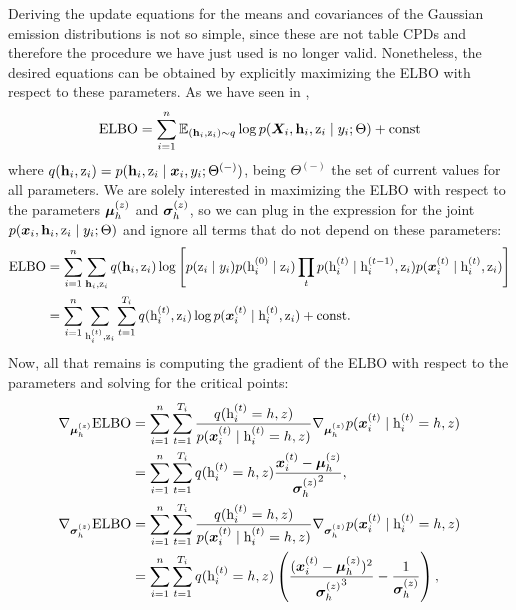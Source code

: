 Deriving the update equations for the means and covariances of the Gaussian emission distributions is not so simple, since these are not table CPDs and therefore the procedure we have just used is no longer valid. Nonetheless, the desired equations can be obtained by explicitly maximizing the ELBO with respect to these parameters. As we have seen in ,
\begin{equation}
	\label{eq:mhmm_elbo}
	\mathrm{ELBO} = \sum_{i=1}^{n} \mathbb{E}_{({\mathbf{h}}_i,{\textnormal{z}}_i) \sim q} \log p({\bm{X}}_i, {\mathbf{h}}_i, {\textnormal{z}}_i \mid y_i; \Theta) + \text{const}
\end{equation}
where $q({\mathbf{h}}_i,{\textnormal{z}}_i) = p({\mathbf{h}}_i, {\textnormal{z}}_i \mid {\bm{x}}_i, y_i; \Theta^{(-)})$, being $\Theta^{(-)}$ the set of current values for all parameters. We are solely interested in maximizing the ELBO with respect to the parameters ${\bm{\mu}}^{(z)}_h$ and ${\bm{\sigma}}^{(z)}_h$, so we can plug in the expression for the joint $p({\bm{x}}_i, {\mathbf{h}}_i, {\textnormal{z}}_i \mid y_i; \Theta)$ and ignore all terms that do not depend on these parameters:
\begin{align}
	\label{eq:mhmm_elbo_gaussian_params}
	\mathrm{ELBO} &= \sum_{i=1}^n \sum_{{\mathbf{h}}_i, {\textnormal{z}}_i} q({\mathbf{h}}_i,{\textnormal{z}}_i) \log \left[p({\textnormal{z}}_i \mid y_i) p({\textnormal{h}}^{(0)}_i \mid {\textnormal{z}}_i) \prod_t p({\textnormal{h}}^{(t)}_i \mid {\textnormal{h}}^{(t-1)}_i, {\textnormal{z}}_i) p({\bm{x}}^{(t)}_i \mid {\textnormal{h}}^{(t)}_i, {\textnormal{z}}_i) \right] \nonumber\\
	&= \sum_{i=1}^n \sum_{{\textnormal{h}}^{(t)}_i, {\textnormal{z}}_i} \sum_{t=1}^{T_i} q({\textnormal{h}}^{(t)}_i, {\textnormal{z}}_i) \log p({\bm{x}}^{(t)}_i \mid {\textnormal{h}}^{(t)}_i, {\textnormal{z}}_i) + \text{const}.
\end{align}
Now, all that remains is computing the gradient of the ELBO with respect to the parameters and solving for the critical points:
\begin{align}
&\nabla_{\vmu^{(z)}_h} \mathrm{ELBO} = \sum_{i=1}^n \sum_{t=1}^{T_i} \frac{q(\rh^{(t)}_i=h, z)}{p(\vx^{(t)}_i \mid \rh^{(t)}_i=h, z)} \nabla_{\vmu^{(z)}_h} p(\vx^{(t)}_i \mid \rh^{(t)}_i=h, z) \nonumber\\
&\hphantom{\nabla_{\vmu^{(z)}_h} \mathrm{ELBO}} = \sum_{i=1}^n  \sum_{t=1}^{T_i} q(\rh^{(t)}_i=h, z) \frac{\vx^{(t)}_i - \vmu^{(z)}_h}{{\vsigma^{(z)}_h}^2}, \\
&\nabla_{\vsigma^{(z)}_h} \mathrm{ELBO} = \sum_{i=1}^n \sum_{t=1}^{T_i} \frac{q(\rh^{(t)}_i=h, z)}{p(\vx^{(t)}_i \mid \rh^{(t)}_i=h, z)} \nabla_{\vsigma^{(z)}_h} p(\vx^{(t)}_i \mid \rh^{(t)}_i=h, z) \nonumber\\
&\hphantom{\nabla_{\vsigma^{(z)}_h} \mathrm{ELBO}} = \sum_{i=1}^n  \sum_{t=1}^{T_i} q(\rh^{(t)}_i=h, z) \left(\frac{(\vx^{(t)}_i - \vmu^{(z)}_h)^2}{{\vsigma^{(z)}_h}^3} - \frac{1}{\vsigma^{(z)}_h}\right),
\end{align}
